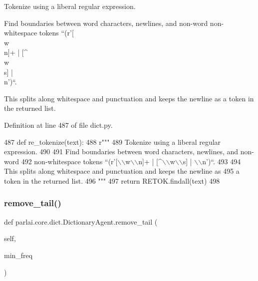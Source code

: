 \begin{DoxyVerb}Tokenize using a liberal regular expression.

Find boundaries between word characters, newlines, and non-word
non-whitespace tokens ``(r'[\\w\\n]+ | [^\\w\\s] | \\n')``.

This splits along whitespace and punctuation and keeps the newline as
a token in the returned list.
\end{DoxyVerb}
 

Definition at line 487 of file dict.\+py.


\begin{DoxyCode}
487     \textcolor{keyword}{def }re\_tokenize(text):
488         \textcolor{stringliteral}{r"""}
489 \textcolor{stringliteral}{        Tokenize using a liberal regular expression.}
490 \textcolor{stringliteral}{}
491 \textcolor{stringliteral}{        Find boundaries between word characters, newlines, and non-word}
492 \textcolor{stringliteral}{        non-whitespace tokens ``(r'[\(\backslash\)\(\backslash\)w\(\backslash\)\(\backslash\)n]+ | [^\(\backslash\)\(\backslash\)w\(\backslash\)\(\backslash\)s] | \(\backslash\)\(\backslash\)n')``.}
493 \textcolor{stringliteral}{}
494 \textcolor{stringliteral}{        This splits along whitespace and punctuation and keeps the newline as}
495 \textcolor{stringliteral}{        a token in the returned list.}
496 \textcolor{stringliteral}{        """}
497         \textcolor{keywordflow}{return} RETOK.findall(text)
498 
\end{DoxyCode}
\mbox{\label{classparlai_1_1core_1_1dict_1_1DictionaryAgent_ae828063449b45112d82a97921d35c247}} 
\subsubsection{\texorpdfstring{remove\+\_\+tail()}{remove\_tail()}}
{\footnotesize\ttfamily def parlai.\+core.\+dict.\+Dictionary\+Agent.\+remove\+\_\+tail (\begin{DoxyParamCaption}\item[{}]{self,  }\item[{}]{min\+\_\+freq }\end{DoxyParamCaption})}

